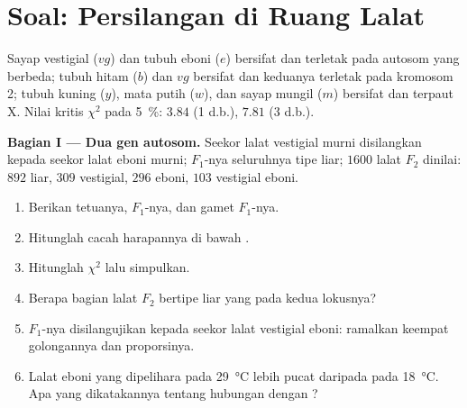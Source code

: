 \section{Soal: Persilangan di Ruang Lalat}

\begin{problem}
\label{pb:b2:meiosis-heredity:1}
Sayap vestigial ($vg$) dan tubuh eboni ($e$) bersifat  dan
terletak pada autosom yang berbeda; tubuh hitam ($b$) dan $vg$ bersifat
 dan keduanya terletak pada kromosom 2; tubuh kuning ($y$), mata
putih ($w$), dan sayap mungil ($m$) bersifat  dan terpaut X.
Nilai kritis $\chi^2$ pada \qty{5}{\%}: $3.84$ (1 d.b.), $7.81$ (3 d.b.).

\medskip
\noindent\textbf{Bagian I --- Dua gen autosom.}
Seekor lalat vestigial murni disilangkan kepada seekor lalat eboni
murni; $F_1$-nya seluruhnya tipe liar; $1600$ lalat $F_2$ dinilai:
$892$ liar, $309$ vestigial, $296$ eboni, $103$ vestigial eboni.
\begin{enumerate}
  \item Berikan  tetuanya,  $F_1$-nya, dan gamet
        $F_1$-nya.
  \item Hitunglah cacah harapannya di bawah .
  \item Hitunglah $\chi^2$ lalu simpulkan.
  \item Berapa bagian lalat $F_2$ bertipe liar yang  pada
        kedua lokusnya?
  \item $F_1$-nya disilangujikan kepada seekor lalat vestigial eboni:
        ramalkan keempat golongannya dan proporsinya.
  \item Lalat eboni yang dipelihara pada \qty{29}{\celsius} lebih pucat
        daripada pada \qty{18}{\celsius}. Apa yang dikatakannya tentang
        hubungan  dengan ?
\end{enumerate}


\end{problem}
